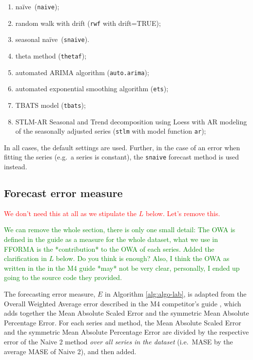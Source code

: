 \documentclass[11pt,a4paper,]{article}
\providecommand{\tightlist}{%
  \setlength{\itemsep}{0pt}\setlength{\parskip}{0pt}}
\def\naive{na\"{i}ve}
\theoremstyle{definition}
\theoremstyle{definition}
\theoremstyle{definition}
\theoremstyle{remark}
\begin{document}
\begin{enumerate}
\def\labelenumi{\roman{enumi}.}
\tightlist
\item
  \naive~(\texttt{naive});
\item
  random walk with drift (\texttt{rwf} with drift=TRUE);
\item
  seasonal \naive~(\texttt{snaive}).
\item
  theta method (\texttt{thetaf});
\item
  automated ARIMA algorithm (\texttt{auto.arima});
\item
  automated exponential smoothing algorithm (\texttt{ets});
\item
  TBATS model (\texttt{tbats});
\item
  STLM-AR Seasonal and Trend decomposition using Loess with AR modeling
  of the seasonally adjusted series (\texttt{stlm} with model function
  \texttt{ar});
\end{enumerate}

In all cases, the default settings are used. Further, in the case of an
error when fitting the series (e.g.~a series is constant), the
\texttt{snaive} forecast method is used instead.

\subsection{Forecast error measure}\label{forecast-error-measure}

\textcolor{red}{We don't need this at all as we stipulate the $L$  below. Let's remove this.}

\textcolor{green}{We can remove the whole section, there is only one small detail:
The OWA is defined in the guide as a measure for the whole dataset, what we use in FFORMA is the *contribution* to the OWA of each series.
Added the clarification in $L$ below. Do you think is enough?
Also, I think the OWA as written in the in the M4 guide *may* not be very clear, personally, I ended up going to the source code they provided.
}

The forecasting error measure, \(E\) in Algorithm \ref{alg:algo-lab}, is
adapted from the Overall Weighted Average error described in the M4
competitor's guide \textcite{M4compguide}, which adds together the Mean
Absolute Scaled Error and the symmetric Mean Absolute Percentage Error.
For each series and method, the Mean Absolute Scaled Error and the
symmetric Mean Absolute Percentage Error are divided by the respective
error of the Naive 2 method \emph{over all series in the dataset}
(i.e.~MASE by the average MASE of Naive 2), and then added.
\end{document}
